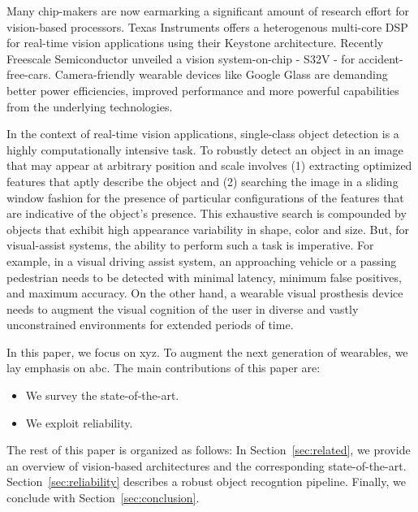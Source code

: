 
Many chip-makers are now earmarking a significant amount of research effort for 
vision-based processors. Texas Instruments offers a heterogenous multi-core DSP for real-time vision applications using their Keystone architecture. 
Recently Freescale Semiconductor unveiled a vision system-on-chip - S32V - for accident-free-cars. Camera-friendly wearable devices like Google Glass are 
demanding better power efficiencies, improved performance and more powerful capabilities from the underlying technologies. 

In the context of real-time vision applications, single-class object detection is a highly computationally intensive task.  
To robustly detect an object
in an image that may appear at arbitrary position and scale involves (1) extracting optimized features that aptly describe the object and (2) 
searching the image in a sliding window fashion for the presence of particular configurations of the features that are indicative of the object's presence. 
This exhaustive search is compounded by objects that exhibit high appearance variability in shape, color and size. 
But, for visual-assist systems, the ability to perform such a task is imperative. For example, in a visual driving
assist system, an approaching vehicle or a passing pedestrian needs to be detected
with minimal latency, minimum false positives, and maximum accuracy. On the other hand, a wearable visual prosthesis device needs to augment the visual cognition of the user 
in diverse and vastly unconstrained environments for extended periods of time.

In this paper, we focus on xyz.
To augment the next generation of wearables, we lay emphasis on abc.
The main contributions of this paper are:
\begin{itemize}
\item We survey the state-of-the-art. 
\item We exploit reliability. 
\end{itemize}

The rest of this paper is organized as follows:
In Section~\ref{sec:related}, we provide an overview of vision-based architectures and the corresponding state-of-the-art.
Section~\ref{sec:reliability} describes a robust object recogntion pipeline.
Finally, we conclude with Section~\ref{sec:conclusion}.



